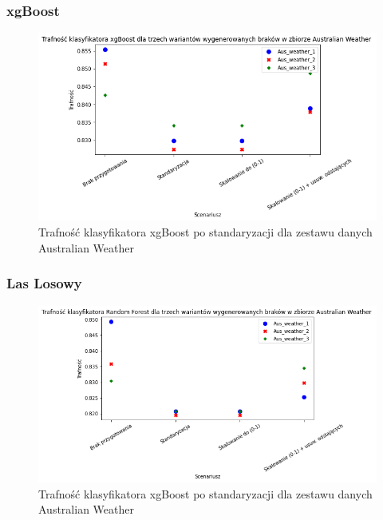 \documentclass{book}
\begin{document}
\subsubsection{xgBoost} 
\begin{figure}[H]
    \centerline{\includegraphics[scale=0.5]{Aus_Weather_xgb_Standaryzacja}}
    \centering
    \caption{Trafność klasyfikatora xgBoost po standaryzacji dla zestawu danych Australian Weather}
    \end{figure}

\subsubsection{Las Losowy}

\begin{figure}[H]
    \centerline{\includegraphics[scale=0.5]{Aus_Weather_rfc_Standaryzacja}}
    \centering
    \caption{Trafność klasyfikatora xgBoost po standaryzacji dla zestawu danych Australian Weather}
    \end{figure}
    
\end{document}
